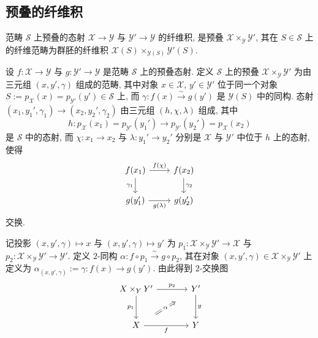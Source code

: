 \subsection{预叠的纤维积}\label{src:3.4.7-subsection}
范畴 $\mathcal S$ 上预叠的态射 $\mathcal X\to\mathcal Y$ 与 $\mathcal Y'\to\mathcal Y$ 的纤维积, 是预叠 $\mathcal X\times_{\mathcal Y}\mathcal Y'$, 其在 $S\in\mathcal S$ 上的纤维范畴为群胚的纤维积 $\mathcal X(S)\times_{\mathcal Y(S)}\mathcal Y'(S)$.
\begin{construction}\label{src:3.4.33}
设 $f:\mathcal X\to\mathcal Y$ 与 $g:\mathcal Y'\to\mathcal Y$ 是范畴 $\mathcal S$ 上的预叠态射. 定义 $\mathcal S$ 上的预叠 $\mathcal X\times_{\mathcal Y}\mathcal Y'$ 为由三元组 $(x,y',\gamma)$ 组成的范畴, 其中对象 $x\in\mathcal X$, $y'\in\mathcal Y'$ 位于同一个对象 $S:=p_{\mathcal X}(x)=p_{\mathcal Y'}(y')\in\mathcal S$ 上, 而 $\gamma:f(x)\xrightarrow{\sim}g(y')$ 是 $\mathcal Y(S)$ 中的同构.
态射 $(x_1,y_1',\gamma_1)\to(x_2,y_2',\gamma_2)$ 由三元组 $(h,\chi,\lambda)$ 组成, 其中
\[
h:p_{\mathcal X}(x_1)=p_{\mathcal Y'}(y_1')
\longrightarrow p_{\mathcal Y'}(y_2')=p_{\mathcal X}(x_2)
\]
是 $\mathcal S$ 中的态射, 而 $\chi:x_1\to x_2$ 与 $\lambda:y_1'\to y_2'$ 分别是 $\mathcal X$ 与 $\mathcal Y'$ 中位于 $h$ 上的态射, 使得
\[
\begin{tikzcd}
f(x_1)\arrow[r,"f(\chi)"]\arrow[d,"\gamma_1"']&
f(x_2)\arrow[d,"\gamma_2"]\\
g(y_1')\arrow[r,"g(\lambda)"']&g(y_2')
\end{tikzcd}
\]
交换.
\end{construction}
记投影 $(x,y',\gamma)\mapsto x$ 与 $(x,y',\gamma)\mapsto y'$ 为 $p_1:\mathcal X\times_{\mathcal Y}\mathcal Y'\to\mathcal X$ 与 $p_2:\mathcal X\times_{\mathcal Y}\mathcal Y'\to\mathcal Y'$. 定义 $2$-同构 $\alpha:f\circ p_1\xrightarrow{\sim}g\circ p_2$, 其在对象 $(x,y',\gamma)\in\mathcal X\times_{\mathcal Y}\mathcal Y'$ 上定义为 $\alpha_{(x,y',\gamma)}:=\gamma:f(x)\to g(y')$. 由此得到 $2$-交换图
\begin{equation}\label{src:3.4.34}
\begin{tikzcd}[column sep=large,row sep=large]
\mathcal X\times_{\mathcal Y}\mathcal Y'\arrow[r,"p_2"]\arrow[d,"p_1"']&
\mathcal Y'\arrow[d,"g"]\\
\mathcal X\arrow[r,"f"']&\mathcal Y
\arrow[Rightarrow,from=2-1,to=1-2,shorten <=1.6em,shorten >=1.6em,"\alpha" description]
\end{tikzcd}
\end{equation}
